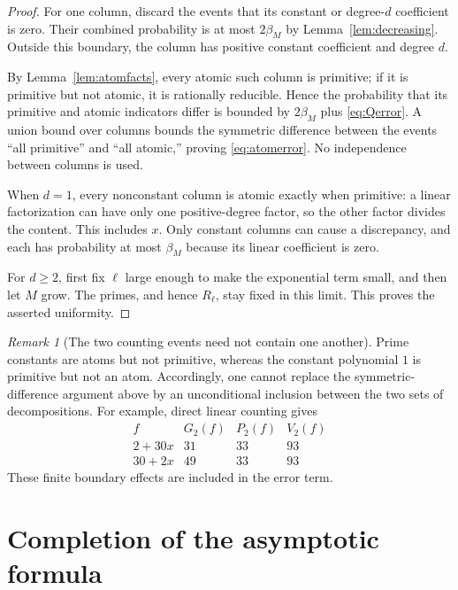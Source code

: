 \documentclass[11pt]{amsart}
\theoremstyle{definition}
\theoremstyle{remark}
\newtheorem{remark}[theorem]{Remark}
\begin{document}
\begin{proof}
For one column, discard the events that its constant or degree-$d$
coefficient is zero. Their combined probability is at most
$2\beta_M$ by Lemma~\ref{lem:decreasing}. Outside this boundary, the
column has positive constant coefficient and degree $d$.

By Lemma~\ref{lem:atomfacts}, every atomic such column is primitive;
if it is primitive but not atomic, it is rationally reducible.
Hence the probability that its primitive and atomic indicators differ
is bounded by $2\beta_M$ plus \eqref{eq:Qerror}. A union bound over
columns bounds the symmetric difference between the events
``all primitive'' and ``all atomic,'' proving \eqref{eq:atomerror}.
No independence between columns is used.

When $d=1$, every nonconstant column is atomic exactly when primitive:
a linear factorization can have only one positive-degree factor, so
the other factor divides the content. This includes $x$. Only constant
columns can cause a discrepancy, and each has probability at most
$\beta_M$ because its linear coefficient is zero.

For $d\ge2$, first fix $\ell$ large enough to make the exponential term
small, and then let $M$ grow. The primes, and hence $R_\ell$, stay fixed
in this limit. This proves the asserted uniformity.
\end{proof}

\begin{remark}[The two counting events need not contain one another]
Prime constants are atoms but not primitive, whereas the constant
polynomial $1$ is primitive but not an atom. Accordingly, one cannot
replace the symmetric-difference argument above by an unconditional
inclusion between the two sets of decompositions. For example, direct
linear counting gives
\[
\begin{array}{c|rrr}
f&G_2(f)&P_2(f)&V_2(f)\\\hline
2+30x&31&33&93\\
30+2x&49&33&93
\end{array}
\]
These finite boundary effects are included in the error term.
\end{remark}

\section{Completion of the asymptotic formula}\label{sec:proof}
\end{document}
